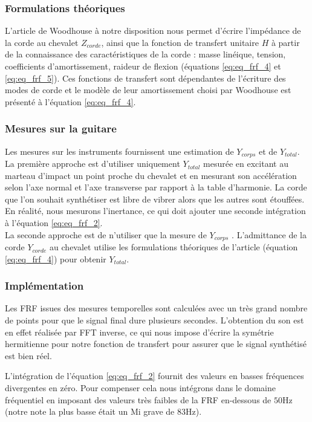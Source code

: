 \subsubsection{Formulations théoriques}
L'article de Woodhouse à notre disposition nous permet d'écrire l'impédance
de la corde au chevalet $Z_{corde}$, ainsi que la fonction de transfert
unitaire $H$ à partir de la connaissance des caractéristiques de la corde :
masse linéique, tension, coefficients d'amortissement, raideur de flexion (équations \ref{eq:eq_frf_4} et \ref{eq:eq_frf_5}). Ces fonctions de transfert sont dépendantes de l'écriture des modes de corde et le modèle de leur amortissement choisi par Woodhouse est présenté à l'équation \ref{eq:eq_frf_4}.

\subsubsection{Mesures sur la guitare}
Les mesures sur les instruments fournissent une estimation de $Y_{corps}$ et de $Y_{total}$. \\

La première approche est d'utiliser uniquement $Y_{total}$ mesurée en
excitant au marteau d'impact un point proche du chevalet et en mesurant son accélération selon l'axe normal et l'axe transverse par rapport à la table
d'harmonie. La corde que l'on souhait synthétiser est libre de vibrer
alors que les autres sont étouffées. En réalité, nous mesurons l'inertance,
ce qui doit ajouter une seconde intégration à l'équation \ref{eq:eq_frf_2}.\\

La seconde approche est de n'utiliser que la mesure de $Y_{corps}$ .
L'admittance de la corde $Y_{corde}$ au chevalet utilise les formulations théoriques de l'article (équation \ref{eq:eq_frf_4}) pour obtenir $Y_{total}$. \\

\subsubsection{Implémentation}
Les FRF issues des mesures temporelles sont calculées avec un très grand nombre de points pour que le signal final dure plusieurs secondes. L'obtention du son est en effet réalisée par FFT inverse, ce qui nous impose d'écrire la symétrie hermitienne pour notre fonction de transfert pour assurer que le signal synthétisé est bien réel.

L'intégration de l'équation \ref{eq:eq_frf_2} fournit des valeurs en basses fréquences divergentes en zéro. Pour compenser cela nous intégrons dans le domaine fréquentiel en imposant des valeurs très faibles de la FRF en-dessous de \( \si{50\Hz} \) (notre note la plus basse était un Mi grave de \( \si{83\Hz} \)).

